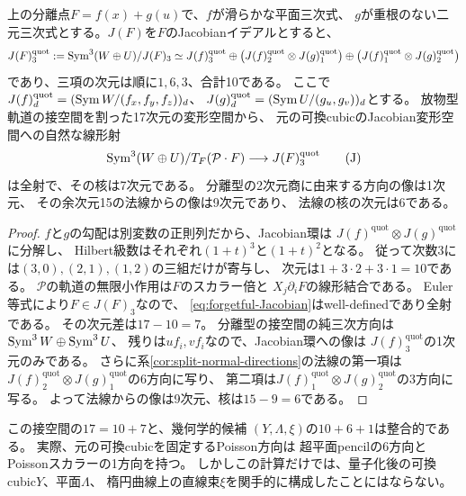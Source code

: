 \begin{proposition}[可換cubicへの忘却と$17=10+7$の接空間]
\label{prop:jacobian-forgetful-tangent}
上の分離点$F=f(x)+g(u)$で、$f$が滑らかな平面三次式、
$g$が重根のない二元三次式とする。$J(F)$を$F$のJacobianイデアルとすると、
\[
  J(F)_3^{\mathrm{quot}}:=\operatorname{Sym}^3(W\oplus U)/J(F)_3
   \simeq J(f)_3^{\mathrm{quot}}
     \oplus\bigl(J(f)_2^{\mathrm{quot}}\otimes J(g)_1^{\mathrm{quot}}\bigr)
     \oplus\bigl(J(f)_1^{\mathrm{quot}}\otimes J(g)_2^{\mathrm{quot}}\bigr)
\]
であり、三項の次元は順に$1,6,3$、合計10である。
ここで$J(f)_d^{\mathrm{quot}}=(\operatorname{Sym} W/(f_x,f_y,f_z))_d$、
$J(g)_d^{\mathrm{quot}}=(\operatorname{Sym} U/(g_u,g_v))_d$とする。
放物型軌道の接空間を割った17次元の変形空間から、
元の可換cubicのJacobian変形空間への自然な線形射
\[
 \operatorname{Sym}^3(W\oplus U)/T_F(\mathcal P\cdot F)
 \longrightarrow J(F)_3^{\mathrm{quot}}
 \tag{J}\label{eq:forgetful-Jacobian}
\]
は全射で、その核は7次元である。
分離型の2次元商に由来する方向の像は1次元、
その余次元15の法線からの像は9次元であり、
法線の核の次元は6である。
\end{proposition}
\begin{proof}
$f$と$g$の勾配は別変数の正則列だから、Jacobian環は
$J(f)^{\mathrm{quot}}\otimes J(g)^{\mathrm{quot}}$に分解し、
Hilbert級数はそれぞれ$(1+t)^3$と$(1+t)^2$となる。
従って次数3には$(3,0),(2,1),(1,2)$の三組だけが寄与し、
次元は$1+3\cdot2+3\cdot1=10$である。
$\mathcal P$の軌道の無限小作用は$F$のスカラー倍と
$X_j\partial_i F$の線形結合である。
Euler等式により$F\in J(F)_3$なので、
\eqref{eq:forgetful-Jacobian}はwell-definedであり全射である。
その次元差は$17-10=7$。
分離型の接空間の純三次方向は$\operatorname{Sym}^3W\oplus\operatorname{Sym}^3U$、
残りは$u f_i,v f_i$なので、Jacobian環への像は
$J(f)_3^{\mathrm{quot}}$の1次元のみである。
さらに系\ref{cor:split-normal-directions}の法線の第一項は
$J(f)_2^{\mathrm{quot}}\otimes J(g)_1^{\mathrm{quot}}$の6方向に写り、
第二項は$J(f)_1^{\mathrm{quot}}\otimes J(g)_2^{\mathrm{quot}}$の3方向に写る。
よって法線からの像は9次元、核は$15-9=6$である。
\end{proof}
\begin{remark}
\label{rem:forgetful-geometry-not-model}
この接空間の$17=10+7$と、幾何学的候補
$(Y,\Lambda,\xi)$の$10+6+1$は整合的である。
実際、元の可換cubicを固定するPoisson方向は
超平面pencilの6方向とPoissonスカラーの1方向を持つ。
しかしこの計算だけでは、量子化後の可換cubic$Y$、平面$\Lambda$、
楕円曲線上の直線束$\xi$を関手的に構成したことにはならない。
\end{remark}

